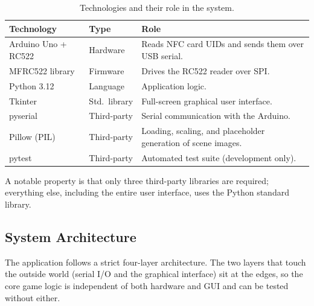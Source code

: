 \begin{table}[htbp]
\centering
\caption{Technologies and their role in the system.}
\label{tab:tech}
\small
\begin{tabular}{@{}llp{7.2cm}@{}}
\toprule
\textbf{Technology} & \textbf{Type} & \textbf{Role} \\
\midrule
Arduino Uno + RC522 & Hardware & Reads NFC card UIDs and sends them over USB
serial. \\
MFRC522 library & Firmware & Drives the RC522 reader over SPI. \\
Python 3.12 & Language & Application logic. \\
Tkinter & Std.\ library & Full-screen graphical user interface. \\
pyserial & Third-party & Serial communication with the Arduino. \\
Pillow (PIL) & Third-party & Loading, scaling, and placeholder generation of
scene images. \\
pytest & Third-party & Automated test suite (development only). \\
\bottomrule
\end{tabular}
\end{table}

A notable property is that only three third-party libraries are required;
everything else, including the entire user interface, uses the Python
standard library.

\subsection{System Architecture}
The application follows a strict four-layer architecture. The two layers that
touch the outside world (serial I/O and the graphical interface) sit at the
edges, so the core game logic is independent of both hardware and GUI and can
be tested without either.


